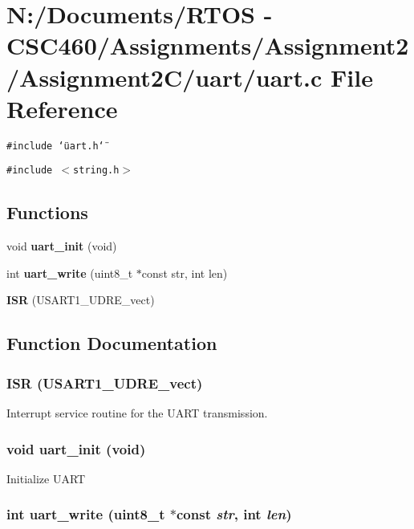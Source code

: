 \section{N:/Documents/RTOS - CSC460/Assignments/Assignment2/Assignment2C/uart/uart.c File Reference}
\label{uart_2uart_8c}
{\tt \#include \char`\"{}uart.h\char`\"{}}\par
{\tt \#include $<$string.h$>$}\par
\subsection*{Functions}
\begin{CompactItemize}
\item 
void {\bf uart\_\-init} (void)
\item 
int {\bf uart\_\-write} (uint8\_\-t $\ast$const str, int len)
\item 
{\bf ISR} (USART1\_\-UDRE\_\-vect)
\end{CompactItemize}


\subsection{Function Documentation}
\subsubsection{\setlength{\rightskip}{0pt plus 5cm}ISR (USART1\_\-UDRE\_\-vect)}\label{uart_2uart_8c_d6441110baf548d12ae53fcbed8075c5}


Interrupt service routine for the UART transmission. 
\subsubsection{\setlength{\rightskip}{0pt plus 5cm}void uart\_\-init (void)}\label{uart_2uart_8c_0c0ca72359ddf28dcd15900dfba19343}


Initialize UART 
\subsubsection{\setlength{\rightskip}{0pt plus 5cm}int uart\_\-write (uint8\_\-t $\ast$const  {\em str}, int {\em len})}\label{uart_2uart_8c_2f98501ce8efc928a596b54a157cc3f0}


